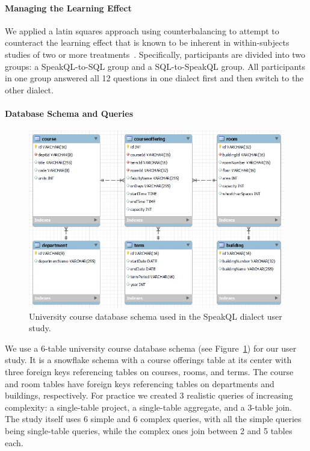 \paragraph{\textbf{Managing the Learning Effect}}
We applied a latin squares approach using counterbalancing to attempt to counteract the learning effect that is known to be inherent in within-subjects studies of two or more treatments~\cite{10.5555/2501707}. 
Specifically, participants are divided into two groups: a SpeakQL-to-SQL group and a SQL-to-SpeakQL group. 
All participants in one group answered all 12 questions in one dialect first and then switch to the other dialect.

\paragraph{\textbf{Database Schema and Queries}}

\begin{figure}
  \centering
  \includegraphics{figures/speakql_university_model.jpg}
  \caption{University course database schema used in the SpeakQL dialect user study.}
  \label{fig:speakqlschema}
\end{figure}

We use a 6-table university course database schema (see Figure~\ref{fig:speakqlschema}) for our user study. 
It is a snowflake schema with a course offerings table at its center with three foreign keys referencing tables on courses, rooms, and terms. 
The course and room tables have foreign keys referencing tables on departments and buildings, respectively.
For practice we created 3 realistic queries of increasing complexity: a single-table project, a single-table aggregate, and a 3-table join. 
The study itself uses 6 simple and 6 complex queries, with all the simple queries being single-table queries, while the complex ones join between 2 and 5 tables each.

